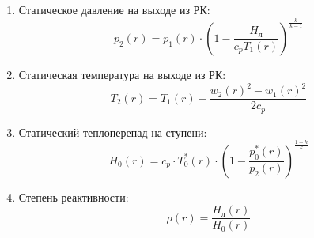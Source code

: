 \documentclass[a4paper,10pt]{article}
\begin{document}
\begin{enumerate}
        \item Статическое давление на выходе из РК:
        \[
            p_2 (r) = p_1(r) \cdot \left( 1 - \frac{H_л}{c_p T_1(r)} \right) ^ {\frac{k}{k - 1}}
        \]

        \item Статическая температура на выходе из РК:
        \[
            T_2 (r) = T_1 (r) - \frac{w_2 (r)^2 - w_1(r)^2}{2 c_p}
        \]

        \item Статический теплоперепад на ступени:
        \[
            H_0 (r) = c_p \cdot T_0^*(r) \cdot \left( 1 - \frac{p_0^*(r)}{p_2(r)} \right) ^ {\frac{1 - k}{k}}
        \]

        \item Степень реактивности:
        \[
            \rho (r) = \frac{H_л (r)}{H_0 (r)}
        \]

    \end{enumerate}
%        
\end{document}
